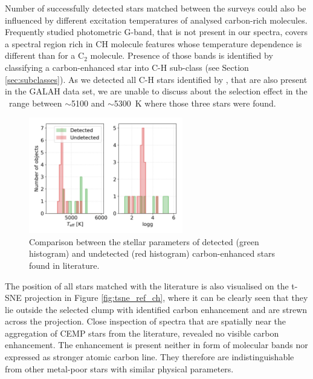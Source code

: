 Number of successfully detected stars matched between the surveys could also be influenced by different excitation temperatures of analysed carbon-rich molecules. Frequently studied photometric G-band, that is not present in our spectra, covers a spectral region rich in CH molecule features whose temperature dependence is different than for a C$_2$ molecule. Presence of those bands is identified by classifying a carbon-enhanced star into C-H sub-class (see Section \ref{sec:subclasses}). As we detected all C-H stars identified by \citet{2016ApJS..226....1J}, that are also present in the GALAH data set, we are unable to discuss about the selection effect in the \Teff\ range between $\sim$5100 and $\sim$5300~K where those three stars were found.

\begin{figure}
	\centering
	\includegraphics[width=0.6\textwidth]{ch_comb.png}
	\caption{Comparison between the stellar parameters of detected (green histogram) and undetected (red histogram) carbon-enhanced stars found in literature.}
	\label{fig:ch_xmatch}
\end{figure}

The position of all stars matched with the literature is also visualised on the \mbox{t-SNE} projection in Figure \ref{fig:tsne_ref_ch}, where it can be clearly seen that they lie outside the selected clump with identified carbon enhancement and are strewn across the projection. Close inspection of spectra that are spatially near the aggregation of CEMP stars from the literature, revealed no visible carbon enhancement. The enhancement is present neither in form of molecular bands nor expressed as stronger atomic carbon line. They therefore are indistinguishable from other metal-poor stars with similar physical parameters.

